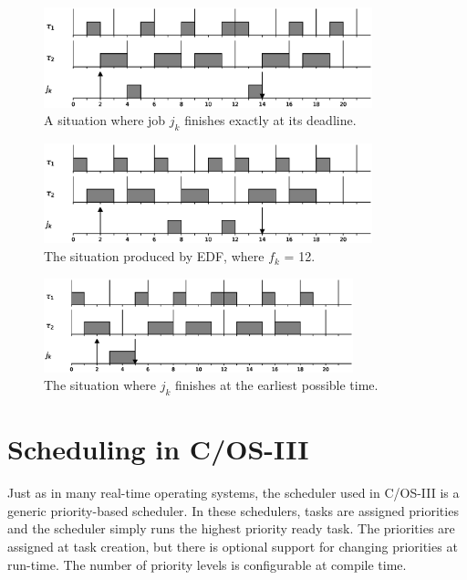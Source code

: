 \documentclass[twoside]{uva-inf-bachelor-thesis}
\newcommand{\ucosiii}{\textmu C/OS-III\xspace}
\begin{document}
\begin{figure}[htpb]
    \centering
    \includegraphics[width=0.85\textwidth]{worstcasedeadline.eps}
    \caption{A situation where job $j_k$ finishes exactly at its deadline.}
    \label{fig:tbsworstdeadline}
\end{figure}

\begin{figure}[htpb]
    \centering
    \includegraphics[width=0.85\textwidth]{edfdeadline.eps}
    \caption{The situation produced by EDF, where $f_k$ = 12.}
    \label{fig:tbsedfdeadline}
\end{figure}

\begin{figure}[htpb]
    \centering
    \includegraphics[width=0.8\textwidth]{optimaldeadline.eps}
    \caption{The situation where $j_k$ finishes at the earliest possible time.}
    \label{fig:tbsoptimaldeadline}
\end{figure}

\section{Scheduling in \ucosiii}
Just as in many real-time operating systems, the scheduler used in \ucosiii is a generic priority-based scheduler. In these schedulers, tasks are assigned priorities and the scheduler simply runs the highest priority ready task. The priorities are assigned at task creation, but there is optional support for changing priorities at run-time. The number of priority levels is configurable at compile time.
\end{document}

